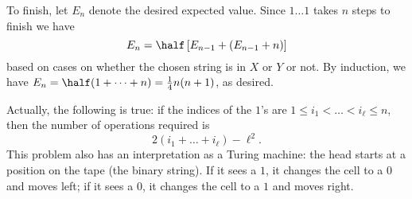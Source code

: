 To finish, let $E_n$ denote the desired expected value.
Since $1 \dots 1$ takes $n$ steps to finish we have
\[ E_n = \half \left[ E_{n-1} + (E_{n-1}+n) \right] \]
based on cases on whether the chosen string is in $X$ or $Y$ or not.
By induction, we have $E_n = \half (1 + \dots + n) = \frac14 n(n+1)$,
as desired.

\begin{remark*}
  Actually, the following is true:
  if the indices of the $1$'s are $1 \le i_1 < \dots < i_\ell \le n$,
  then the number of operations required is
  \[ 2(i_1 + \dots + i_\ell) - \ell^2. \]
  This problem also has an interpretation as a Turing machine:
  the head starts at a position on the tape (the binary string).
  If it sees a $1$, it changes the cell to a $0$ and moves left;
  if it sees a $0$, it changes the cell to a $1$ and moves right.
\end{remark*}
\pagebreak